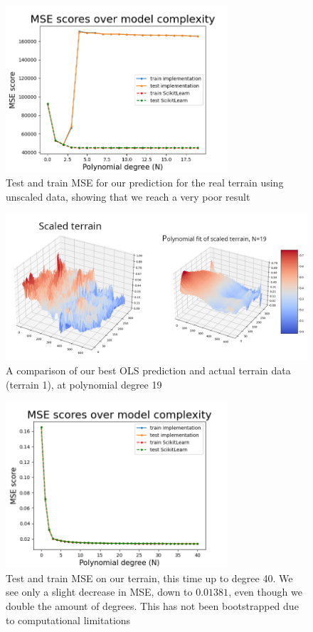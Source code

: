 \documentclass[twocolumn,10pt,cleanfoot]{asme2ej}
\begin{document}
\begin{figure}
\centerline{\includegraphics[width=3.25in]{figure/realunscaledmse.png}}
\caption{Test and train MSE for our prediction for the real terrain using unscaled data, showing that we reach a very poor result}
\label{realunscaledmse}
\end{figure}




\begin{figure} 
\centerline{\includegraphics[width=6.85in]{figure/real1surfacecomp.png}}
\caption{A comparison of our best OLS prediction and actual terrain data (terrain 1), at polynomial degree 19}
\label{real1surfacecomp}
\end{figure}

\begin{figure}
\centerline{\includegraphics[width=3.25in]{figure/realOLSmse40.png}}
\caption{Test and train MSE on our terrain, this time up to degree 40. We see only a slight decrease in MSE, down to $0.01381$, even though we double the amount of degrees. This has not been bootstrapped due to computational limitations}
\label{realOLSmse40}
\end{figure}
\end{document}
